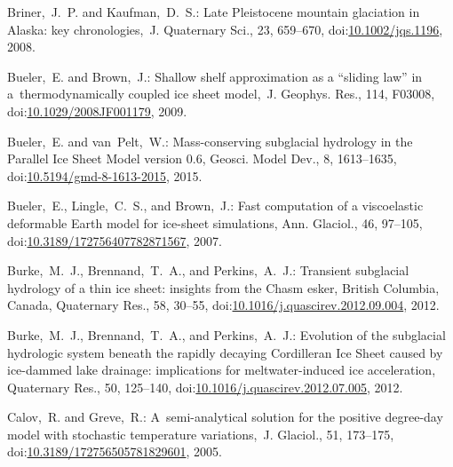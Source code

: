 \documentclass[tc, manuscript]{copernicus}
\begin{document}
\begin{thebibliography}{114}
Briner,~J.~P. and Kaufman,~D.~S.: Late Pleistocene mountain glaciation in Alaska: key chronologies,~J. Quaternary Sci., 23, 659--670,
doi:\href{http://dx.doi.org/10.1002/jqs.1196}{10.1002/jqs.1196}, 2008.


Bueler,~E. and Brown,~J.: Shallow shelf approximation as a ``sliding law'' in a~thermodynamically coupled ice sheet model,~J. Geophys. Res., 114, F03008,
doi:\href{http://dx.doi.org/10.1029/2008JF001179}{10.1029/2008JF001179}, 2009.


 Bueler,~E. and van~Pelt,~W.: Mass-conserving subglacial hydrology in the Parallel Ice Sheet Model version 0.6, Geosci. Model Dev., 8, 1613--1635,
doi:\href{http://dx.doi.org/10.5194/gmd-8-1613-2015}{10.5194/gmd-8-1613-2015}, 2015.


Bueler,~E., Lingle,~C.~S., and Brown,~J.: Fast computation of a viscoelastic deformable Earth model for ice-sheet simulations, Ann. Glaciol., 46, 97--105,
doi:\href{http://dx.doi.org/10.3189/172756407782871567}{10.3189/172756407782871567}, 2007.


Burke,~M.~J., Brennand,~T.~A., and Perkins,~A.~J.: Transient subglacial hydrology of a thin ice sheet: insights from the Chasm esker, British Columbia, Canada, Quaternary Res., 58, 30--55,
doi:\href{http://dx.doi.org/10.1016/j.quascirev.2012.09.004}{10.1016/j.quascirev.2012.09.004}, 2012{}.


Burke,~M.~J., Brennand,~T.~A., and Perkins,~A.~J.: Evolution of the subglacial hydrologic system beneath the rapidly decaying Cordilleran Ice Sheet caused by ice-dammed lake drainage: implications for meltwater-induced ice acceleration, Quaternary Res., 50, 125--140,
doi:\href{http://dx.doi.org/10.1016/j.quascirev.2012.07.005}{10.1016/j.quascirev.2012.07.005}, 2012{}.


Calov,~R. and Greve,~R.: A~semi-analytical solution for the positive degree-day model with stochastic temperature variations,~J. Glaciol., 51, 173--175,
doi:\href{http://dx.doi.org/10.3189/172756505781829601}{10.3189/172756505781829601}, 2005.



\end{thebibliography}
\end{document}
